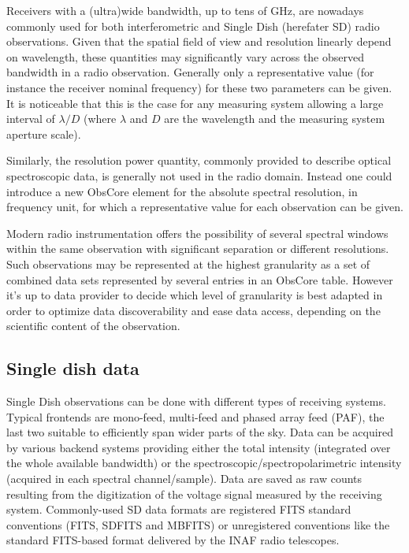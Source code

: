\documentclass[11pt,a4paper]{ivoa}
\begin{document}
Receivers with a (ultra)wide bandwidth, up to tens of GHz, are
nowadays commonly used for both interferometric and Single Dish (herefater SD) radio observations.
Given that the spatial field of view and resolution linearly depend on wavelength, these quantities may significantly vary across the observed bandwidth in a radio observation.
Generally only a representative value (for instance the
receiver nominal frequency) for these two parameters can be given. It is
noticeable that this is the case for any measuring system allowing a large interval of
$\lambda/D$ (where $\lambda$ and $D$ are the wavelength and the measuring system
aperture scale).
 
Similarly, the resolution power quantity, commonly provided to describe optical spectroscopic data, is generally not used in the radio domain.
Instead one could introduce a new ObsCore element for the absolute spectral resolution, in frequency unit, for which a representative value for each observation can be given.

Modern radio instrumentation offers the possibility of several  spectral windows within the same observation with significant separation or different resolutions.
Such observations may be represented at the highest granularity as  a set of combined data sets represented by several entries in an ObsCore table. However it's up to data provider to decide which level of granularity is best adapted in order to optimize data discoverability and ease data access, depending on the scientific content of the observation.



\subsection{Single dish data}\label{subsec:sd}

Single Dish observations can be done with different types of receiving systems. Typical frontends are mono-feed, multi-feed and phased array feed (PAF), the last two suitable to efficiently span wider parts of the sky.
Data can be acquired by various backend systems providing either the total intensity (integrated over the whole available bandwidth) or the spectroscopic/spectropolarimetric intensity (acquired in each spectral channel/sample).
Data are saved as raw counts resulting from the digitization of the voltage signal measured by the receiving system.
Commonly-used SD data formats are registered FITS standard conventions (FITS, SDFITS and MBFITS) or unregistered conventions like the standard FITS-based format delivered by the INAF radio telescopes.
\end{document}
